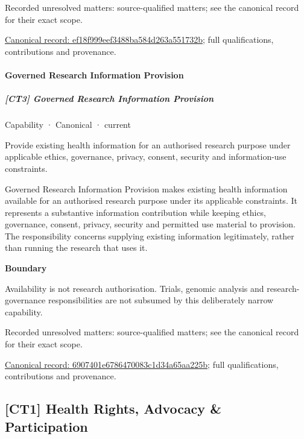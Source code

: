 {\small Recorded unresolved matters: source-qualified matters; see the canonical record for their exact scope.}\par
{\footnotesize \href{../../../../continuum/strategy/capability/ef18f999eef3488ba584d263a551732b.md}{Canonical record: ef18f999eef3488ba584d263a551732b}; full qualifications, contributions and provenance.}\par
\paragraph{Governed Research Information Provision}

\subparagraph{[CT3] Governed Research Information Provision}

\label{element:6907401e6786470083c1d34a65aa225b}
{\small Capability · Canonical · current}\par

Provide existing health information for an authorised research purpose under applicable ethics, governance, privacy, consent, security and information-use constraints.



Governed Research Information Provision makes existing health information available for an authorised research purpose under its applicable constraints. It represents a substantive information contribution while keeping ethics, governance, consent, privacy, security and permitted use material to provision. The responsibility concerns supplying existing information legitimately, rather than running the research that uses it.



\textbf{Boundary}



Availability is not research authorisation. Trials, genomic analysis and research-governance responsibilities are not subsumed by this deliberately narrow capability.


{\small Recorded unresolved matters: source-qualified matters; see the canonical record for their exact scope.}\par
{\footnotesize \href{../../../../continuum/strategy/capability/6907401e6786470083c1d34a65aa225b.md}{Canonical record: 6907401e6786470083c1d34a65aa225b}; full qualifications, contributions and provenance.}\par
\subsection{[CT1] Health Rights, Advocacy \& Participation}

